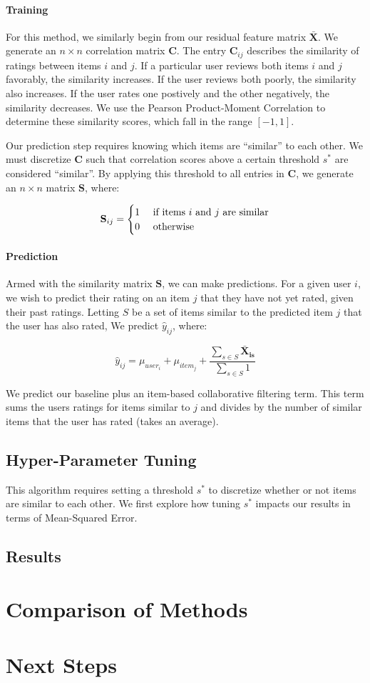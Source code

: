 \documentclass[12pt]{article}
\begin{document}
\paragraph{Training} For this method, we similarly begin from our residual feature matrix $\mathbf{\bar X}$. We generate an $n \times n$ correlation matrix $\mathbf{C}$. The entry $\mathbf{C}_{ij}$ describes the similarity of ratings between items $i$ and $j$. If a particular user reviews both items $i$ and $j$ favorably, the similarity increases. If the user reviews both poorly, the similarity also increases. If the user rates one postively and the other negatively, the similarity decreases. We use the Pearson Product-Moment Correlation to determine these similarity scores, which fall in the range $[-1, 1]$.

Our prediction step requires knowing which items are ``similar'' to each other. We must discretize $\mathbf{C}$ such that correlation scores above a certain threshold $s^*$ are considered ``similar''. By applying this threshold to all entries in $\mathbf{C}$, we generate an $n \times n$ matrix $\mathbf{S}$, where:

$$
\mathbf{S}_{ij} =
\begin{cases}
    \hfill 1    \hfill & \text{ if items $i$ and $j$ are similar} \\
    \hfill 0    \hfill & \text{ otherwise} \\
\end{cases}
$$

\paragraph{Prediction} Armed with the similarity matrix $\mathbf{S}$, we can make predictions. For a given user $i$, we wish to predict their rating on an item $j$ that they have not yet rated, given their past ratings. Letting $S$ be a set of items similar to the predicted item $j$ that the user has also rated, We predict $\hat y_{ij}$, where:

$$ \hat y_{ij} = \mu_{user_i} + \mu_{item_j} + \frac{\sum_{s \in S} \mathbf{\bar X_{is}}}{\sum_{s \in S} 1 }$$

We predict our baseline plus an item-based collaborative filtering term. This term sums the users ratings for items similar to $j$ and divides by the number of similar items that the user has rated (takes an average).

\subsection{Hyper-Parameter Tuning}
This algorithm requires setting a threshold $s^*$ to discretize whether or not items are similar to each other. We first explore how tuning $s^*$ impacts our results in terms of Mean-Squared Error.

\subsection{Results}

\section{Comparison of Methods}

\section{Next Steps}
\end{document}
